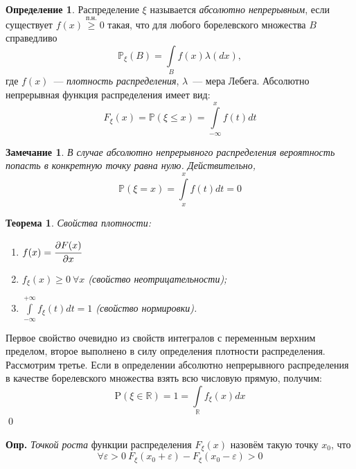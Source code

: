 \documentclass[oneside,final,14pt]{extreport}
\newcommand\mydef{{\bf Опр.}}
\renewenvironment{proof}{{\bfseries Доказательство.}}{\qed}
\newtheorem{thm}{Теорема}[section]
\newtheorem*{rmrk}{Замечание}
\theoremstyle{definition}
\newtheorem{defn}{Определение}[section]
\begin{document}
\begin{defn}
    Распределение $\xi$ называется {\it абсолютно непрерывным}, если существует $f(x) \overset{\text{п.н.}}{\geqslant} 0$ такая, что для любого борелевского множества $B$ справедливо
    \begin{equation*}
        \mathbb{P}_\xi(B) = \int\limits_B f(x) \lambda(dx),
    \end{equation*}
    где $f(x)$~--- {\it плотность распределения}, $\lambda$~--- мера Лебега. Абсолютно непрерывная функция распределения имеет вид:
    \begin{equation*}
        F_\xi(x) = \mathbb{P}(\xi \leqslant x) = \int\limits_{-\infty}^x f(t)dt
    \end{equation*}
\end{defn}
\begin{rmrk}
    В случае абсолютно непрерывного распределения вероятность попасть в конкретную точку равна нулю. Действительно,
    \begin{equation*}
        \mathbb{P}(\xi = x) = \int\limits_{x}^{x} f(t)dt = 0
    \end{equation*}
\end{rmrk}
\begin{thm}
Свойства плотности:
\begin{enumerate}
    \item $f(x) = \cfrac{\partial F(x)}{\partial x}$
    \item $f_\xi(x) \geqslant 0~ \forall x$ (свойство неотрицательности);
    \item $\int\limits_{-\infty}^{+\infty} f_\xi(t) dt = 1$ (свойство нормировки).
\end{enumerate}
\end{thm}
\begin{proof}
    Первое свойство очевидно из свойств интегралов с переменным верхним пределом, второе выполнено в силу определения плотности распределения. Рассмотрим третье. Если в определении абсолютно непрерывного распределения в качестве борелевского множества взять всю числовую прямую, получим: 
    \begin{equation*}
        \mathrm{P}(\xi \in \mathbb{R})=1=\int\limits_{\mathbb{R}} f_{\xi}(x) dx
    \end{equation*}
\end{proof}

\mydef{} {\it Точкой роста} функции распределения $F_\xi(x)$ назовём такую точку $x_0$, что
\begin{equation*}
    \forall \varepsilon > 0~ F_\xi(x_0 + \varepsilon) - F_\xi(x_0 - \varepsilon) > 0
\end{equation*}
\end{document}
